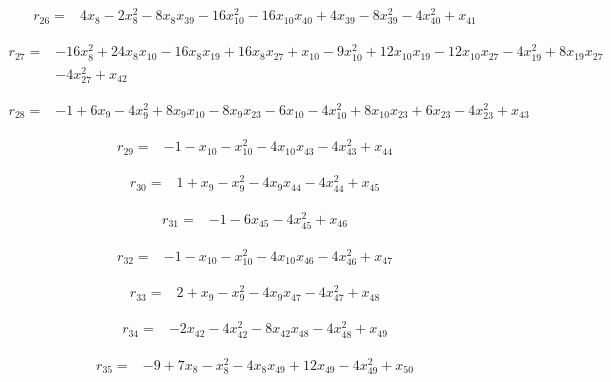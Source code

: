 \begin{align*}
r_{26}={}&4x_{8}-2x_{8}^{2}-8x_{8}x_{39}-16x_{10}^{2}-16x_{10}x_{40}+4x_{39}-8x_{39}^{2}-4x_{40}^{2}+x_{41}
\end{align*}

\begin{align*}
r_{27}={}&-16x_{8}^{2}+24x_{8}x_{10}-16x_{8}x_{19}+16x_{8}x_{27}+x_{10}-9x_{10}^{2}+12x_{10}x_{19}-12x_{10}x_{27}-4x_{19}^{2}+8x_{19}x_{27}\\
&-4x_{27}^{2}+x_{42}
\end{align*}

\begin{align*}
r_{28}={}&-1+6x_{9}-4x_{9}^{2}+8x_{9}x_{10}-8x_{9}x_{23}-6x_{10}-4x_{10}^{2}+8x_{10}x_{23}+6x_{23}-4x_{23}^{2}+x_{43}
\end{align*}

\begin{align*}
r_{29}={}&-1-x_{10}-x_{10}^{2}-4x_{10}x_{43}-4x_{43}^{2}+x_{44}
\end{align*}

\begin{align*}
r_{30}={}&1+x_{9}-x_{9}^{2}-4x_{9}x_{44}-4x_{44}^{2}+x_{45}
\end{align*}

\begin{align*}
r_{31}={}&-1-6x_{45}-4x_{45}^{2}+x_{46}
\end{align*}

\begin{align*}
r_{32}={}&-1-x_{10}-x_{10}^{2}-4x_{10}x_{46}-4x_{46}^{2}+x_{47}
\end{align*}

\begin{align*}
r_{33}={}&2+x_{9}-x_{9}^{2}-4x_{9}x_{47}-4x_{47}^{2}+x_{48}
\end{align*}

\begin{align*}
r_{34}={}&-2x_{42}-4x_{42}^{2}-8x_{42}x_{48}-4x_{48}^{2}+x_{49}
\end{align*}

\begin{align*}
r_{35}={}&-9+7x_{8}-x_{8}^{2}-4x_{8}x_{49}+12x_{49}-4x_{49}^{2}+x_{50}
\end{align*}

